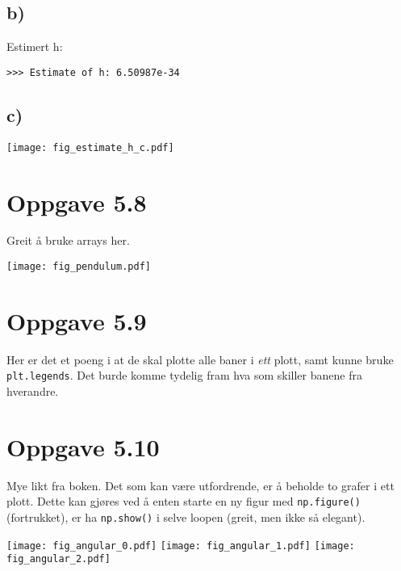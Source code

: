 \documentclass[10pt,a4paper]{article}
\begin{document}
\subsection*{b)}
Estimert h:
\begin{verbatim}
>>> Estimate of h: 6.50987e-34
\end{verbatim}
\subsection*{c)}
\texttt{[image: fig\_estimate\_h\_c.pdf]}


\section*{Oppgave 5.8} 
Greit å bruke arrays her. 

\texttt{[image: fig\_pendulum.pdf]}



\newpage
\section*{Oppgave 5.9}
Her er det et poeng i at de skal plotte alle baner i \textit{ett} plott, samt kunne bruke \texttt{plt.legends}. Det burde komme tydelig fram hva som skiller banene fra hverandre. 




\newpage
\section*{Oppgave 5.10}
Mye likt fra boken. Det som kan være utfordrende, er å beholde to grafer i ett plott. Dette kan gjøres ved å enten starte en ny figur med \texttt{np.figure()} (fortrukket), er ha \texttt{np.show()} i selve loopen (greit, men ikke så elegant). 

\texttt{[image: fig\_angular\_0.pdf]}
\texttt{[image: fig\_angular\_1.pdf]}
\texttt{[image: fig\_angular\_2.pdf]}
\end{document}
